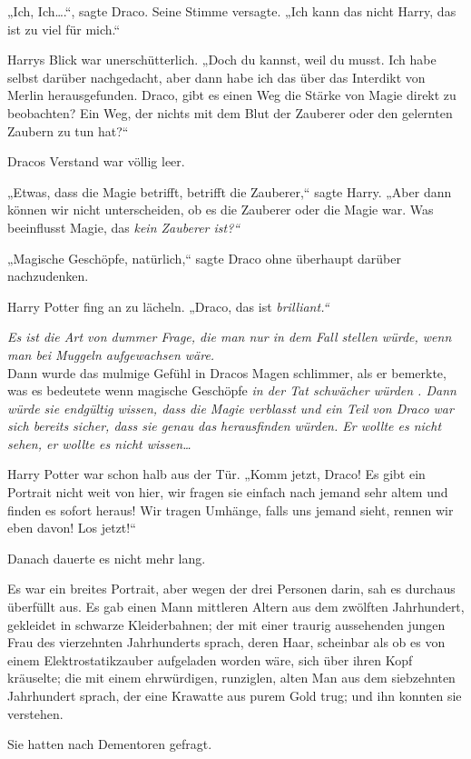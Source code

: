 {„Ich, Ich….“, sagte Draco. Seine Stimme versagte. „Ich kann das nicht Harry, das ist zu viel für mich.“

Harrys Blick war unerschütterlich. „Doch du kannst, weil du musst. Ich habe selbst darüber nachgedacht, aber dann habe ich das über das Interdikt von Merlin herausgefunden. Draco, gibt es einen Weg die Stärke von Magie direkt zu beobachten? Ein Weg, der nichts mit dem Blut der Zauberer oder den gelernten Zaubern zu tun hat?“

Dracos Verstand war völlig leer.

„Etwas, dass die Magie betrifft, betrifft die Zauberer,“ sagte Harry. „Aber dann können wir nicht unterscheiden, ob es die Zauberer oder die Magie war. Was beeinflusst Magie, das \emph{kein Zauberer ist?“}

„Magische Geschöpfe, natürlich,“ sagte Draco ohne überhaupt darüber nachzudenken.

Harry Potter fing an zu lächeln. „Draco, das ist \emph{brilliant.“}

\emph{Es ist die Art von dummer Frage, die man nur in dem Fall stellen würde, wenn man bei Muggeln aufgewachsen wäre.}\\ Dann wurde das mulmige Gefühl in Dracos Magen schlimmer, als er bemerkte, was es bedeutete wenn magische Geschöpfe \emph{in der Tat schwächer würden . Dann würde sie endgültig wissen, dass die Magie verblasst und ein Teil von Draco war sich bereits sicher, dass sie genau das herausfinden würden. Er wollte es nicht sehen, er wollte es nicht \emph{wissen}…}

Harry Potter war schon halb aus der Tür. „Komm jetzt, Draco! Es gibt ein Portrait nicht weit von hier, wir fragen sie einfach nach jemand sehr altem und finden es sofort heraus! Wir tragen Umhänge, falls uns jemand sieht, rennen wir eben davon! Los jetzt!“

Danach dauerte es nicht mehr lang.

Es war ein breites Portrait, aber wegen der drei Personen darin, sah es durchaus überfüllt aus. Es gab einen Mann mittleren Altern aus dem zwölften Jahrhundert, gekleidet in schwarze Kleiderbahnen; der mit einer traurig aussehenden jungen Frau des vierzehnten Jahrhunderts sprach, deren Haar, scheinbar als ob es von einem Elektrostatikzauber aufgeladen worden wäre, sich über ihren Kopf kräuselte; die mit einem ehrwürdigen, runziglen, alten Man aus dem siebzehnten Jahrhundert sprach, der eine Krawatte aus purem Gold trug; und ihn konnten sie verstehen.

Sie hatten nach Dementoren gefragt.

}
